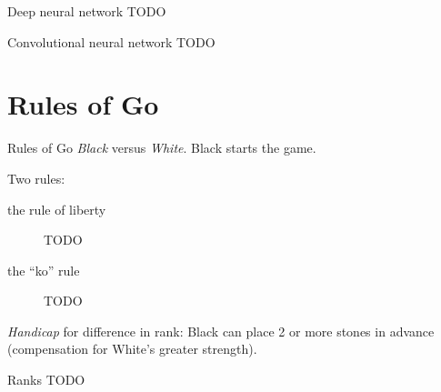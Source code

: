 \documentclass{beamer}
\newcommand{\todo}{\alert{TODO}}
\begin{document}
  \begin{frame}{Deep neural network}
    \todo
  \end{frame}

  \begin{frame}{Convolutional neural network}
    \todo
  \end{frame}


  \section{Rules of Go}
  \begin{frame}{Rules of Go}
    \emph{Black} versus \emph{White}.
    Black starts the game.

    \pause
    Two rules:
    \begin{description}
      \item [the rule of liberty] \todo
      \item [the ``ko'' rule] \todo
    \end{description}

    \pause
    \emph{Handicap} for difference in rank:
    Black can place 2 or more stones in advance (compensation for White's greater strength).
  \end{frame}

  \begin{frame}{Ranks}
    \todo
  \end{frame}

\end{document}

